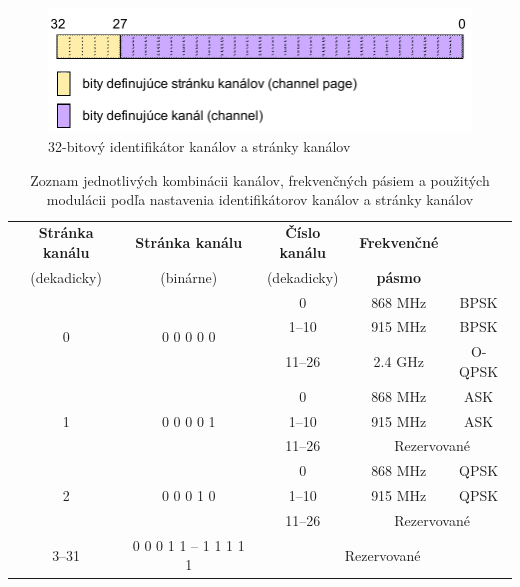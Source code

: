 \begin{figure}[htbp]
\begin{center}
\includegraphics[width=120mm]{figures/channel_page}
\caption{32-bitový identifikátor kanálov a stránky kanálov}
\label{fig:channel_page}
\end{center}
\end{figure}

\begin{table}[htbp]
\begin{center}
\begin{tabular}{|c|c|c|c|c|}
  \hline
  \textbf{Stránka kanálu} & \textbf{Stránka kanálu} & \textbf{Číslo kanálu} & \textbf{Frekvenčné} & \\
  (dekadicky) & (binárne) & (dekadicky) & \textbf{pásmo} & \raisebox{1.5ex}{\textbf{Modulácia}} \\
  \hline
  \hline
  \multirow{3}{*}{0} & \multirow{3}{*}{0 0 0 0 0} & 0 & 868 MHz & BPSK \\
  \cline{3-5}
  & & 1--10 & 915 MHz & BPSK \\
  \cline{3-5}
  & & 11--26 &  2.4 GHz & O-QPSK \\ [0.5ex]
  \hline
  \multirow{3}{*}{1} & \multirow{3}{*}{0 0 0 0 1} & 0 & 868 MHz & ASK \\
  \cline{3-5}
  & & 1--10 & 915 MHz & ASK \\
  \cline{3-5}
  & & 11--26 & \multicolumn{2}{|c|}{Rezervované} \\ [0.5ex]
  \hline
  \multirow{3}{*}{2} & \multirow{3}{*}{0 0 0 1 0} & 0 & 868 MHz & QPSK \\
  \cline{3-5}
  & & 1--10 & 915 MHz & QPSK \\
  \cline{3-5}
  & & 11--26 & \multicolumn{2}{|c|}{Rezervované} \\ [0.5ex]
  \hline
  3--31 & 0 0 0 1 1 -- 1 1 1 1 1 & \multicolumn{3}{|c|}{Rezervované} \\ [0.5ex]
  \hline
\end{tabular}
\caption{Zoznam jednotlivých kombinácii kanálov, frekvenčných pásiem a použitých modulácii podľa nastavenia identifikátorov kanálov a stránky kanálov}
\label{tab:channel_page}
\end{center}
\end{table}

